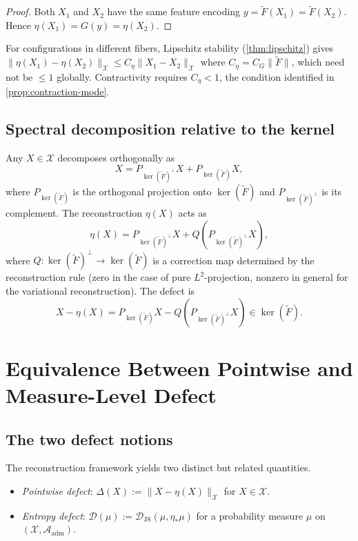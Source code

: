 \documentclass[12pt, oneside]{memoir}
\newcommand{\X}{\mathcal{X}}
\newcommand{\Ft}{\widetilde{F}}
\newcommand{\Aadm}{\mathcal{A}_{\mathrm{adm}}}
\newcommand{\Djs}{\mathcal{D}_{\mathrm{JS}}}
\newcommand{\nnorm}[1]{\lVert #1 \rVert}
\begin{document}
\begin{proof}
Both $X_1$ and $X_2$ have the same feature encoding $y = \Ft(X_1) = \Ft(X_2)$.  Hence
$\eta(X_1) = G(y) = \eta(X_2)$.
\end{proof}

For configurations in different fibers, Lipschitz stability (\cref{thm:lipschitz}) gives
$\nnorm{\eta(X_1) - \eta(X_2)}_\X \le C_\eta \nnorm{X_1 - X_2}_\X$ where $C_\eta = C_G
\nnorm{\Ft}$, which need not be $\le 1$ globally.  Contractivity requires $C_\eta < 1$,
the condition identified in \cref{prop:contraction-mode}.

\section{Spectral decomposition relative to the kernel}

Any $X \in \X$ decomposes orthogonally as
\[
  X = P_{\ker(\Ft)^\perp} X + P_{\ker(\Ft)} X,
\]
where $P_{\ker(\Ft)}$ is the orthogonal projection onto $\ker(\Ft)$ and
$P_{\ker(\Ft)^\perp}$ is its complement.  The reconstruction $\eta(X)$ acts as
\[
  \eta(X) = P_{\ker(\Ft)^\perp} X + Q(P_{\ker(\Ft)^\perp} X),
\]
where $Q: \ker(\Ft)^\perp \to \ker(\Ft)$ is a correction map determined by the
reconstruction rule (zero in the case of pure $L^2$-projection, nonzero in general for
the variational reconstruction).  The defect is
\[
  X - \eta(X) = P_{\ker(\Ft)} X - Q(P_{\ker(\Ft)^\perp} X) \in \ker(\Ft).
\]

\chapter{Equivalence Between Pointwise and Measure-Level Defect}
\label{ch:defect-equiv}

\section{The two defect notions}

The reconstruction framework yields two distinct but related quantities.

\begin{definition}
\label{def:two-defects}
\begin{itemize}
  \item \emph{Pointwise defect}: $\Delta(X) := \nnorm{X - \eta(X)}_\X$ for $X \in \X$.
  \item \emph{Entropy defect}: $\mathcal{D}(\mu) := \Djs(\mu, \eta_*\mu)$ for a
        probability measure $\mu$ on $(\X, \Aadm)$.
\end{itemize}
\end{definition}
\end{document}
